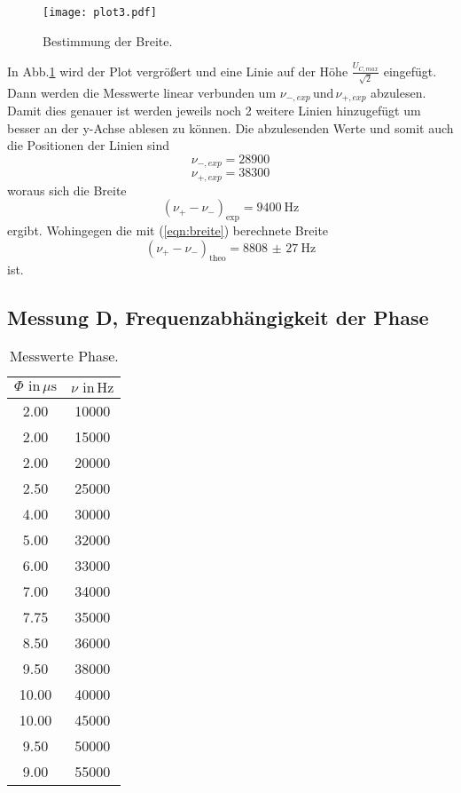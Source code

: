 \begin{figure}
  \centering
  \texttt{[image: plot3.pdf]}
  \caption{Bestimmung der Breite.}
  \label{fig:plot3}
\end{figure}

In Abb.\ref{fig:plot3} wird der Plot vergrößert und eine Linie auf der Höhe
$\frac{U_{C,max}}{\sqrt{2}}$ eingefügt. Dann werden die Messwerte linear
verbunden um $\nu_{-,exp}\, \text{und}\,\nu_{+,exp}$ abzulesen. Damit dies
genauer ist werden jeweils noch 2 weitere Linien hinzugefügt um besser an der y-Achse
ablesen zu können.
Die abzulesenden Werte und somit auch die Positionen der Linien sind
\begin{equation*}
  \nu_{-,exp} = 28900
\end{equation*}
\begin{equation*}
  \nu_{+,exp} = 38300
\end{equation*}
woraus sich die Breite
\begin{equation*}
  (\nu_{+}-\nu_{-})_{\text{exp}} = \SI{9400}{\hertz}
\end{equation*}
ergibt. Wohingegen die mit (\ref{eqn:breite}) berechnete Breite
\begin{equation*}
  (\nu_{+}-\nu_{-})_{\text{theo}} = \SI{8808(27)}{\hertz}
\end{equation*}
ist.

\subsection{Messung D, Frequenzabhängigkeit der Phase}

\begin{table}[h]
  \centering
  \label{tab:Uc}
  \begin{tabular}{ c c }
    \toprule
    {$\Phi \,\, \text{in} \,\si{\mu\second}$}
   &{$\nu \,\, \text{in} \,\si{\hertz}$} \\

    \midrule
    2.00    & 10000 \\
    2.00    & 15000 \\
    2.00    & 20000 \\
    2.50    & 25000 \\
    4.00    & 30000 \\
    5.00    & 32000 \\
    6.00    & 33000 \\
    7.00    & 34000 \\
    7.75    & 35000 \\
    8.50    & 36000 \\
    9.50    & 38000 \\
    10.00   & 40000 \\
    10.00   & 45000 \\
    9.50    & 50000 \\
    9.00    & 55000 \\


    \bottomrule
  \end{tabular}
  \caption{Messwerte Phase.}
\end{table}

